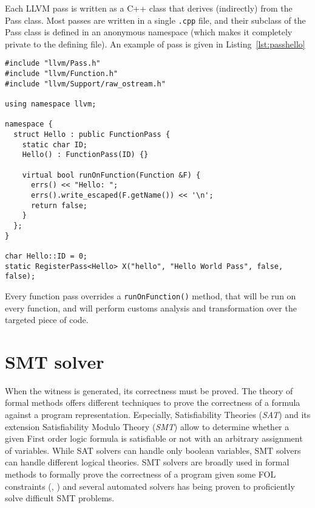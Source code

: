 Each LLVM pass is written as a C++ class that derives (indirectly) from the Pass class. Most passes are written in a single \texttt{.cpp} file, and their subclass of the Pass class is defined in an anonymous namespace (which makes it completely private to the defining file). An example of pass is given in Listing~\ref{lst:passhello}

\begin{lstlisting}[caption={Example of pass}, label={lst:passhello}, float =hb]
#include "llvm/Pass.h"
#include "llvm/Function.h"
#include "llvm/Support/raw_ostream.h"

using namespace llvm;

namespace {
  struct Hello : public FunctionPass {
    static char ID;
    Hello() : FunctionPass(ID) {}

    virtual bool runOnFunction(Function &F) {
      errs() << "Hello: ";
      errs().write_escaped(F.getName()) << '\n';
      return false;
    }
  };
}

char Hello::ID = 0;
static RegisterPass<Hello> X("hello", "Hello World Pass", false, false);
\end{lstlisting}

Every function pass overrides a \texttt{runOnFunction()} method, that will be run on every function, and will perform customs analysis and transformation over the targeted piece of code.

\section{SMT solver}
\label{sec:smt_solver}

When the witness is generated, its correctness must be proved. The theory of formal methods offers different techniques to prove the correctness of a formula against a program representation. Especially, Satisfiability Theories (\emph{SAT}) and its extension Satisfiability Modulo Theory (\emph{SMT}) allow to determine whether a given First order logic formula is satisfiable or not with an arbitrary assignment of variables. While SAT solvers can handle only boolean variables, SMT solvers can handle different logical theories. SMT solvers are broadly used in formal methods to formally prove the correctness of a program given some FOL constraints (\cite{griggio2009effective}, \cite{Moskal09satisfiabilitymodulo})  and several automated solvers has being proven to proficiently solve difficult SMT problems.


